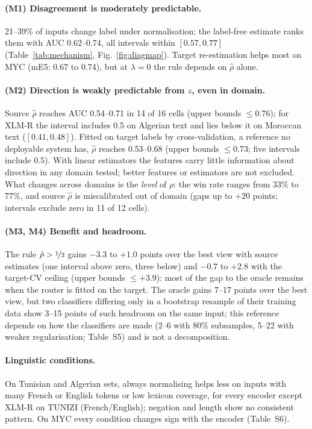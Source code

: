 \paragraph{(M1) Disagreement is moderately predictable.} 21--39\% of inputs change label under normalisation; the label-free estimate ranks them with AUC 0.62--0.74, all intervals within $[0.57,0.77]$ (Table~\ref{tab:mechanism}, Fig.~\ref{fig:diagmap}). Target re-estimation helps most on MYC (mE5: 0.67 to 0.74), but at $\lambda=0$ the rule depends on $\hat\rho$ alone.

\paragraph{(M2) Direction is weakly predictable from $z$, even in domain.} Source $\hat\rho$ reaches AUC 0.54--0.71 in 14 of 16 cells (upper bounds $\le0.76$); for XLM-R the interval includes 0.5 on Algerian text and lies below it on Moroccan text ($[0.41,0.48]$). Fitted on target labels by cross-validation, a reference no deployable system has, $\hat\rho$ reaches 0.53--0.68 (upper bounds $\le0.73$; five intervals include 0.5). With linear estimators the features carry little information about direction in any domain tested; better features or estimators are not excluded. What changes across domains is the \emph{level} of $\rho$: the win rate ranges from 33\% to 77\%, and source $\hat\rho$ is miscalibrated out of domain (gaps up to $+20$ points; intervals exclude zero in 11 of 12 cells).

\paragraph{(M3, M4) Benefit and headroom.} The rule $\hat\rho>\nicefrac12$ gains $-3.3$ to $+1.0$ points over the best view with source estimates (one interval above zero, three below) and $-0.7$ to $+2.8$ with the target-CV ceiling (upper bounds $\le+3.9$): most of the gap to the oracle remains when the router is fitted on the target. The oracle gains 7--17 points over the best view, but two classifiers differing only in a bootstrap resample of their training data show 3--15 points of such headroom on the same input; this reference depends on how the classifiers are made (2--6 with 80\% subsamples, 5--22 with weaker regularisation; Table~S5) and is not a decomposition.

\paragraph{Linguistic conditions.} On Tunisian and Algerian sets, always normalising helps less on inputs with many French or English tokens or low lexicon coverage, for every encoder except XLM-R on TUNIZI (French/English); negation and length show no consistent pattern. On MYC every condition changes sign with the encoder (Table~S6).


